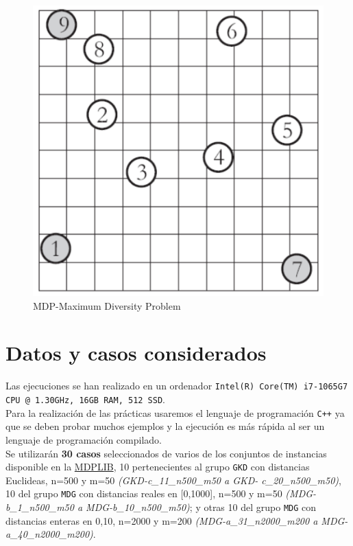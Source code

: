 \begin{figure}[H]
	\centering
	\includegraphics[scale=0.35]{img/mdp.png}
	\caption{MDP-Maximum Diversity Problem}
\end{figure}


\section{Datos y casos considerados}
\hspace{1.5cm} Las ejecuciones se han realizado en un ordenador \texttt{Intel(R) Core(TM) i7-1065G7 CPU @ 1.30GHz, 16GB RAM, 512 SSD}. \\

Para la realización de las prácticas usaremos el lenguaje de programación \texttt{C++} ya que se deben probar muchos ejemplos y la ejecución es más rápida al ser un lenguaje de programación compilado. \\

Se utilizarán \textbf{30 casos} seleccionados de varios de los conjuntos de instancias disponible en la \href{http://www.optsicom.es/mdp/}{MDPLIB}, 10 pertenecientes al grupo \texttt{GKD} con distancias Euclideas, n=500 y m=50 \textit{(GKD-c\_11\_n500\_m50 a GKD-
c\_20\_n500\_m50)}, 10 del grupo \texttt{MDG} con distancias reales en [0,1000], n=500 y m=50
\textit{(MDG-b\_1\_n500\_m50 a MDG-b\_10\_n500\_m50)}; y otras 10 del grupo \texttt{MDG} con distancias enteras en {0,10}, n=2000 y m=200 \textit{(MDG-a\_31\_n2000\_m200 a MDG-
a\_40\_n2000\_m200)}. \\

